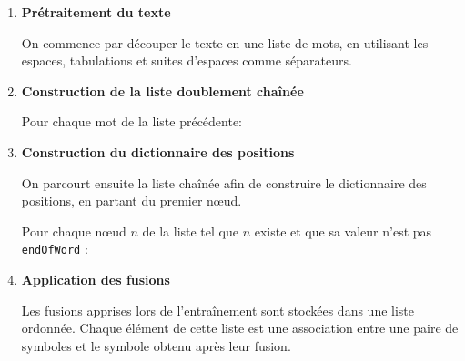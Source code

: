 \documentclass[12pt,a4paper]{report}
\begin{document}
	\begin{enumerate}
		\item \textbf{Prétraitement du texte}
		
		On commence par découper le texte en une liste de mots, en utilisant les espaces, tabulations et suites d’espaces comme séparateurs.
		
		\item \textbf{Construction de la liste doublement chaînée}
		
		Pour chaque mot de la liste précédente:
		
		\item \textbf{Construction du dictionnaire des positions}
		
		On parcourt ensuite la liste chaînée afin de construire le dictionnaire des positions, en partant du premier nœud.
		
		Pour chaque nœud $n$ de la liste tel que $n$ existe et que sa valeur n’est pas \texttt{endOfWord} :
		
		
		\item \textbf{Application des fusions}
		
		Les fusions apprises lors de l'entraînement sont stockées dans une liste ordonnée. Chaque élément de cette liste est une association entre une paire de symboles et le symbole obtenu après leur fusion.
		

\end{enumerate}
\end{document}
